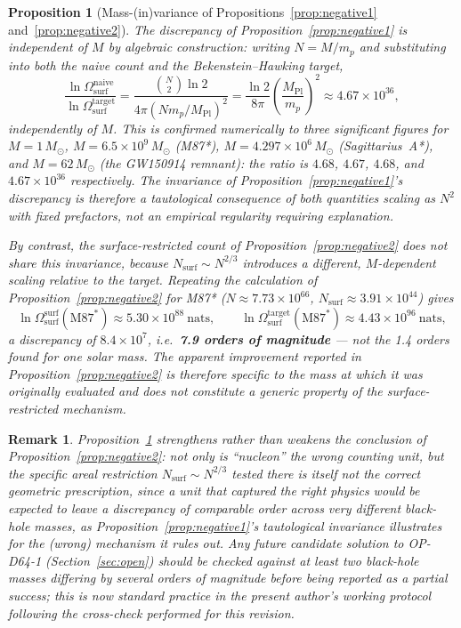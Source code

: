 \documentclass[12pt,a4paper]{article}
\newtheorem{proposition}[theorem]{Proposition}
\newtheorem{remark}[theorem]{Remark}
\newcommand{\Omegasurf}{\Omega_{\mathrm{surf}}}
\newcommand{\MPl}{M_{\mathrm{Pl}}}
\begin{document}
\begin{proposition}[Mass-(in)variance of Propositions~\ref{prop:negative1} and~\ref{prop:negative2}]
\label{prop:massinvariance}
The discrepancy of Proposition~\ref{prop:negative1} is independent of $M$ by algebraic construction: writing $N=M/m_p$ and substituting into both the naive count and the Bekenstein--Hawking target,
\begin{equation}
\frac{\ln\Omegasurf^{\mathrm{naive}}}{\ln\Omegasurf^{\mathrm{target}}} = \frac{\binom{N}{2}\ln 2}{4\pi(N m_p/\MPl)^2} = \frac{\ln 2}{8\pi}\left(\frac{\MPl}{m_p}\right)^2 \approx 4.67\times10^{36},
\end{equation}
independently of $M$. This is confirmed numerically to three significant figures for $M=1\,M_\odot$, $M=6.5\times10^{9}\,M_\odot$ (M87*), $M=4.297\times10^6\,M_\odot$ (Sagittarius~A*), and $M=62\,M_\odot$ (the GW150914 remnant): the ratio is $4.68$, $4.67$, $4.68$, and $4.67\times10^{36}$ respectively. The invariance of Proposition~\ref{prop:negative1}'s discrepancy is therefore a tautological consequence of both quantities scaling as $N^2$ with fixed prefactors, not an empirical regularity requiring explanation.

By contrast, the surface-restricted count of Proposition~\ref{prop:negative2} does \emph{not} share this invariance, because $N_{\mathrm{surf}}\sim N^{2/3}$ introduces a different, $M$-dependent scaling relative to the target. Repeating the calculation of Proposition~\ref{prop:negative2} for M87* ($N\approx7.73\times10^{66}$, $N_{\mathrm{surf}}\approx3.91\times10^{44}$) gives
\begin{equation}
\ln\Omegasurf^{\mathrm{surf}}(\mathrm{M87}^*) \approx 5.30\times10^{88}~\mathrm{nats}, \qquad \ln\Omegasurf^{\mathrm{target}}(\mathrm{M87}^*) \approx 4.43\times10^{96}~\mathrm{nats},
\end{equation}
a discrepancy of $8.4\times10^{7}$, i.e.\ \textbf{7.9 orders of magnitude} --- not the 1.4 orders found for one solar mass. The apparent improvement reported in Proposition~\ref{prop:negative2} is therefore specific to the mass at which it was originally evaluated and does not constitute a generic property of the surface-restricted mechanism.
\end{proposition}

\begin{remark}
Proposition~\ref{prop:massinvariance} strengthens rather than weakens the conclusion of Proposition~\ref{prop:negative2}: not only is ``nucleon'' the wrong counting unit, but the specific areal restriction $N_{\mathrm{surf}}\sim N^{2/3}$ tested there is itself not the correct geometric prescription, since a unit that captured the right physics would be expected to leave a discrepancy of comparable order across very different black-hole masses, as Proposition~\ref{prop:negative1}'s tautological invariance illustrates for the (wrong) mechanism it rules out. Any future candidate solution to OP-D64-1 (Section~\ref{sec:open}) should be checked against at least two black-hole masses differing by several orders of magnitude before being reported as a partial success; this is now standard practice in the present author's working protocol following the cross-check performed for this revision.
\end{remark}
\end{document}
